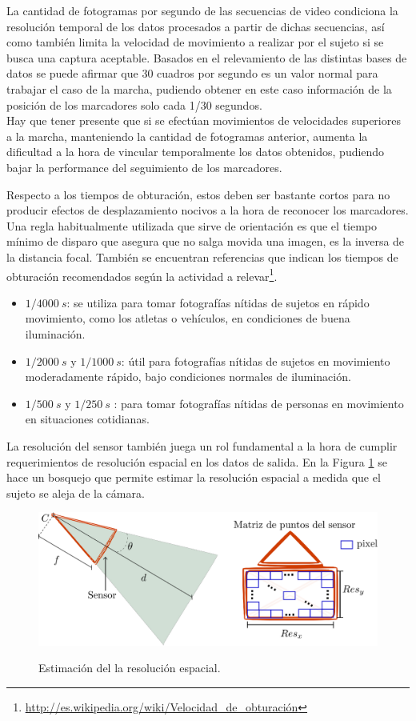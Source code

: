 La cantidad de fotogramas por segundo de las secuencias de video condiciona la resolución temporal de los datos procesados a partir de dichas secuencias, así como también limita la velocidad de movimiento a realizar por el sujeto si se busca una captura aceptable.
Basados en el relevamiento de las distintas bases de datos se puede afirmar que 30 cuadros por segundo es un valor normal para trabajar el caso de la marcha, pudiendo obtener en este caso información de la posición de los marcadores solo cada 1/30 segundos.\\ 
Hay que tener presente que si se efectúan movimientos de velocidades superiores a la marcha, manteniendo la cantidad de fotogramas anterior, aumenta la dificultad a la hora de vincular temporalmente los datos obtenidos, pudiendo bajar la performance del seguimiento de los marcadores. 

Respecto a los tiempos de obturación, estos deben ser bastante cortos  para no producir efectos de desplazamiento nocivos a la hora de reconocer los marcadores.
Una regla habitualmente utilizada que sirve de orientación es que el tiempo mínimo de disparo que asegura que no salga movida una imagen, es la inversa de la distancia focal. También se encuentran referencias que indican los tiempos de obturación recomendados según la actividad a relevar\footnote{\textcolor{blue}{\underline{\url{http://es.wikipedia.org/wiki/Velocidad_de_obturación}}}}.
\begin{itemize}
\item $1 / 4000~ s$:  se utiliza para tomar fotografías nítidas de sujetos en rápido movimiento, como los atletas o vehículos, en condiciones de buena iluminación.
\item $1 / 2000 ~s$ y $1/ 1000~s$: útil  para fotografías nítidas de sujetos en movimiento moderadamente rápido, bajo condiciones normales de iluminación.
\item $1 / 500~s$ y $1/ 250~s$ :  para tomar fotografías nítidas de personas en movimiento en situaciones cotidianas.
\end{itemize}
 
 
 La resolución del sensor también juega un rol fundamental a la hora de cumplir requerimientos de resolución espacial en los datos de salida.
 En la Figura \ref{estimacion_resolucion} se hace un bosquejo que permite estimar la resolución espacial a medida que el sujeto se aleja de la cámara.
 
\begin{figure}[H]
  \centering
  {\includegraphics[scale=0.5]{img/Base_Datos/camara_resolucion.eps}}      
  \caption{Estimación del la resolución espacial.}
  \label{estimacion_resolucion}
\end{figure} 

